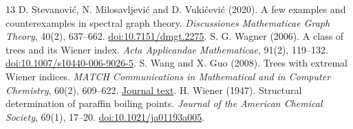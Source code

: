 \documentclass[11pt,a4paper]{article}
\theoremstyle{remark}
\begin{document}
\begin{thebibliography}{13}
 D. Stevanović, N. Milosavljević and D. Vukičević (2020). A few examples and counterexamples in spectral graph theory. \emph{Discussiones Mathematicae Graph Theory}, 40(2), 637--662. \href{https://doi.org/10.7151/dmgt.2275}{doi:10.7151/dmgt.2275}.
 S. G. Wagner (2006). A class of trees and its Wiener index. \emph{Acta Applicandae Mathematicae}, 91(2), 119--132. \href{https://doi.org/10.1007/s10440-006-9026-5}{doi:10.1007/s10440-006-9026-5}.
 S. Wang and X. Guo (2008). Trees with extremal Wiener indices. \emph{MATCH Communications in Mathematical and in Computer Chemistry}, 60(2), 609--622. \href{https://match.pmf.kg.ac.rs/electronic_versions/Match60/n2/match60n2_609-622.pdf}{Journal text}.
 H. Wiener (1947). Structural determination of paraffin boiling points. \emph{Journal of the American Chemical Society}, 69(1), 17--20. \href{https://doi.org/10.1021/ja01193a005}{doi:10.1021/ja01193a005}.
\end{thebibliography}
\end{document}
